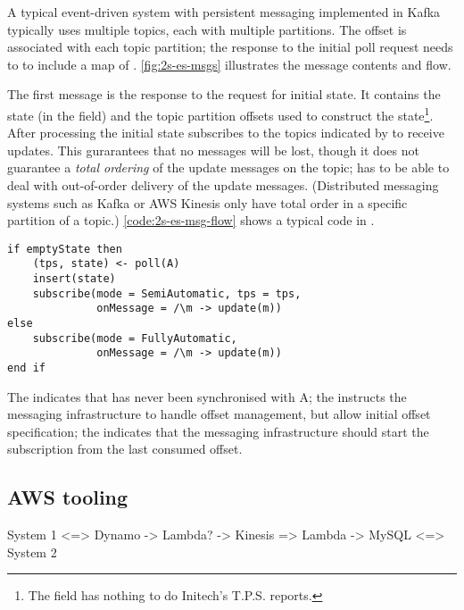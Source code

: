 A typical event-driven system with persistent messaging implemented in Kafka typically uses multiple topics, each with multiple partitions. The offset is associated with each topic partition; the response to the initial poll request needs to to include a map of . \autoref{fig:2s-es-msgs} illustrates the message contents and flow.


The first message is the response to the request for initial state. It contains the state (in the  field) and the topic partition offsets used to construct the state\footnote{The  field has nothing to do Initech's T.P.S. reports.}. After processing the initial state  subscribes to the topics indicated by  to receive updates. This gurarantees that no messages will be lost, though it does not guarantee a \emph{total ordering} of the update messages on the topic;  has to be able to deal with out-of-order delivery of the update messages. (Distributed messaging systems such as Kafka\cite{kafka} or AWS Kinesis\cite{kinesis} only have total order in a specific partition of a topic.) \autoref{code:2s-es-msg-flow} shows a typical code in .


\begin{lstlisting}[caption={Message flow}, label={code:2s-es-msg-flow}, language=Pseudo, escapechar=|]
if emptyState then 
    (tps, state) <- poll(A)
    insert(state)
    subscribe(mode = SemiAutomatic, tps = tps, 
              onMessage = /\m -> update(m))
else
    subscribe(mode = FullyAutomatic,
              onMessage = /\m -> update(m))
end if
\end{lstlisting}

The  indicates that  has never been synchronised with A; the  instructs the messaging infrastructure to handle offset management, but allow initial offset specification; the  indicates that the messaging infrastructure should start the subscription from the last consumed offset.

\subsection{AWS tooling}
System 1 <=> Dynamo -> Lambda? -> Kinesis => Lambda -> MySQL <=> System 2

